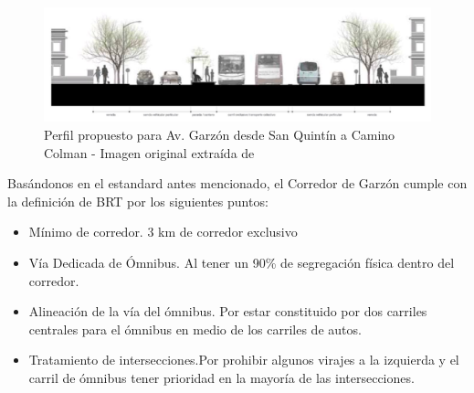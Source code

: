 \begin{figure}[H]
	\centering
	\includegraphics[width=0.9\linewidth]{Figures/busway_configuration}
	\caption{Perfil propuesto para Av. Garzón desde San Quintín a Camino Colman - Imagen original extraída de \citep{PlanMovilidad}
	}
	\label{fig:Perfil propuesto de Corredor de Garzon}
\end{figure}

Basándonos en el estandard antes mencionado, el Corredor de Garzón cumple con la definición de BRT por los siguientes puntos:
\begin{itemize}
	\item Mínimo de corredor. 3 km de corredor exclusivo 
	\item Vía Dedicada de Ómnibus. Al tener un 90\% de segregación física dentro del corredor.
	\item Alineación de la vía del ómnibus. Por estar constituido por dos carriles centrales para el ómnibus en medio de los carriles de autos.
	\item Tratamiento de intersecciones.Por prohibir algunos virajes a la izquierda y el carril de ómnibus tener prioridad en la mayoría de las intersecciones.
\end{itemize}


